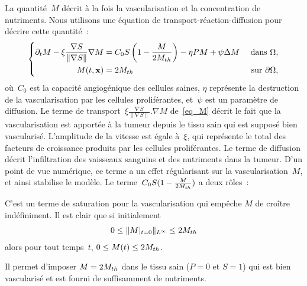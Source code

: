 \documentclass[main.tex]{subfiles}
\begin{document}
La quantité~$M$ décrit à la fois la vascularisation et la concentration de nutriments. Nous utilisons une équation de transport-réaction-diffusion pour décrire cette quantité~:
\begin{equation}\label{eq_M}
\left\{
\begin{aligned}
\partial_t M - \xi \frac{\nabla S}{\| \nabla S \|}\nabla M &= C_0 S
\left(1-\frac{M}{2M_{th}}\right) - \eta PM +\psi \Delta M & \textrm{ dans } \Omega, \\
M(t,\mathbf{x})&= 2M_{th} & \textrm{ sur } \partial \Omega,
\end{aligned}
\right.
\end{equation}
où~$C_0$ est la capacité angiogénique des cellules saines, 
$\eta$ représente la destruction de la vascularisation par les cellules proliférantes, et~$\psi$ est un paramètre de diffusion.  
Le terme de transport~$\xi \frac{\nabla S}{\| \nabla S \|}. \nabla M$ de~\eqref{eq_M} décrit le fait que la vascularisation est apportée à la tumeur depuis le tissu sain qui est supposé bien vascularisé.  
L'amplitude de la vitesse est égale à~$\xi$, qui représente le total des facteurs de croissance produits par les cellules proliférantes. 
Le terme de diffusion décrit l'infiltration des vaisseaux sanguins et des nutriments dans la tumeur. D'un point de vue numérique, ce terme a un effet régularisant sur la vascularisation~$M$, et ainsi stabilise le modèle. 
Le terme~$C_0S(1-\frac{M}{2M_{th}})$ a deux rôles~:
\begin{myitemize}
\item C'est un terme de saturation pour la vascularisation qui empêche $M$ de croître indéfiniment. 
Il est clair que si initialement 
\begin{align}\label{eq:borneM}
0\leq \|M|_{t=0}\|_{L^\infty}\leq 2M_{th}
\end{align}
alors pour tout temps~$t$, $0\leq M(t) \leq 2M_{th}$. 
\item Il permet d'imposer $M=2M_{th}$ dans le tissu sain ($P=0$ et $S=1$) qui est bien vascularisé et est fourni de suffisamment de nutriments.
\end{myitemize}
\end{document}
